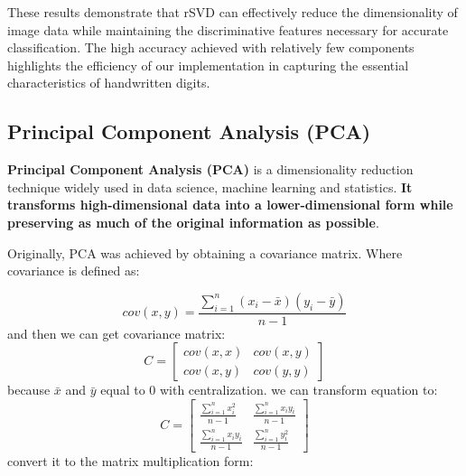 \documentclass[11pt,a4paper]{article}
\begin{document}
These results demonstrate that rSVD can effectively reduce the dimensionality of image data while maintaining the discriminative features necessary for accurate classification. The high accuracy achieved with relatively few components highlights the efficiency of our implementation in capturing the essential characteristics of handwritten digits.

\subsection{Principal Component Analysis (PCA)}
\textbf{Principal Component Analysis (PCA)} is a dimensionality reduction technique widely used in data science, machine learning and statistics. \textbf{It transforms high-dimensional data into a lower-dimensional form while preserving as much of the original information as possible}.

Originally, PCA was achieved by obtaining a covariance matrix. Where covariance is defined as:

\begin{equation}
    cov(x,y)=\frac{\sum_{i=1}^n(x_i-\bar{x})\left(y_i-\bar{y}\right)}{n-1}
\end{equation}
and then we can get covariance matrix:
\begin{equation}
    C=
\begin{bmatrix}
cov(x,x) & cov(x,y) \\
cov(x,y) & cov(y,y)
\end{bmatrix}
\end{equation}
because $\bar{x}$ and $\bar{y}$ equal to 0 with centralization. we can transform equation to:
\begin{equation}
        C=
\begin{bmatrix}
\frac{\sum_{i=1}^nx_i^2}{n-1} & \frac{\sum_{i=1}^nx_iy_i}{n-1} \\
\frac{\sum_{i=1}^nx_iy_i}{n-1} & \frac{\sum_{i=1}^ny_i^2}{n-1}
\end{bmatrix}
\end{equation}
convert it to the matrix multiplication form:
\end{document}
